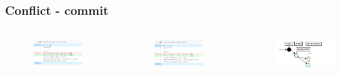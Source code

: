\documentclass[aspectratio=169]{beamer} %
\begin{document}
\begin{frame}
	\frametitle{Conflict - commit}
	\begin{columns}[c]
		
		\vspace{-.6cm}
		\begin{figure}
			\centering
			\includegraphics[width=.9\textwidth]{./img/conflict-img-commits-1.png}
		\end{figure}
		\vspace{-.3cm}
		\begin{figure}
			\centering
			\includegraphics[width=.9\textwidth]{./img/conflict-img-commits-2.png}
		\end{figure}
		

		\vspace{-.6cm}
		\begin{figure}
			\centering
			\includegraphics[width=.9\textwidth]{./img/conflict-network-commits.png}
		\end{figure}
		

\end{columns}
\end{frame}
\end{document}
